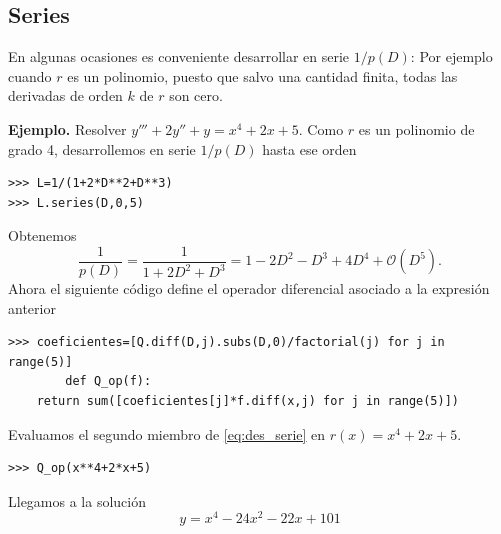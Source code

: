 \subsection{Series}
En algunas ocasiones es conveniente desarrollar en serie $1/p(D)$:
Por ejemplo cuando $r$ es un polinomio, puesto que salvo una cantidad finita, todas las derivadas de orden $k$ de $r$ son cero.

\noindent\textbf{Ejemplo.} Resolver $y'''+2y''+y=x^4+2x+5$.
Como $r$ es un polinomio de grado 4, desarrollemos en serie $1/p(D)$ hasta ese orden

\begin{lstlisting}
>>> L=1/(1+2*D**2+D**3)
>>> L.series(D,0,5)
\end{lstlisting}
Obtenemos
\[\frac{1}{p(D)}=\frac{1}{1+2D^2+D^3}=
1 - 2 D^{2} - D^{3} + 4 D^{4} + \mathcal{O}\left(D^{5}\right).\]
Ahora el siguiente código  define el operador diferencial asociado a la expresión anterior
\begin{lstlisting}
>>> coeficientes=[Q.diff(D,j).subs(D,0)/factorial(j) for j in range(5)]
        def Q_op(f):
	return sum([coeficientes[j]*f.diff(x,j) for j in range(5)])
\end{lstlisting}

Evaluamos el segundo miembro de  \eqref{eq:des_serie} en $r(x)=x^4+2x+5$.
\begin{lstlisting}
>>> Q_op(x**4+2*x+5)
\end{lstlisting}
Llegamos a la solución
\[y=x^{4} - 24 x^{2} - 22 x + 101
\]

%